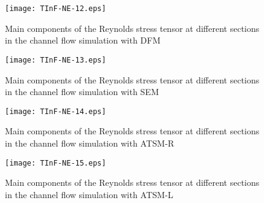 \begin{figure}[H]
\centering
\texttt{[image: TInF-NE-12.eps]}
\caption{Main components of the Reynolds stress tensor at different sections in the channel flow simulation with DFM}\label{dfm}
 \end{figure}
 
 
\begin{figure}[H]
\centering
\texttt{[image: TInF-NE-13.eps]}
\caption{Main components of the Reynolds stress tensor at different sections in the channel flow simulation with SEM}\label{sem}
 \end{figure}


\begin{figure}[H]
\centering
\texttt{[image: TInF-NE-14.eps]}
\caption{Main components of the Reynolds stress tensor at different sections in the channel flow simulation with ATSM-R}\label{atsmr}
 \end{figure}
 
 
\begin{figure}[H]
\centering
\texttt{[image: TInF-NE-15.eps]}
\caption{Main components of the Reynolds stress tensor at different sections in the channel flow simulation with ATSM-L}\label{atsml}
 \end{figure}